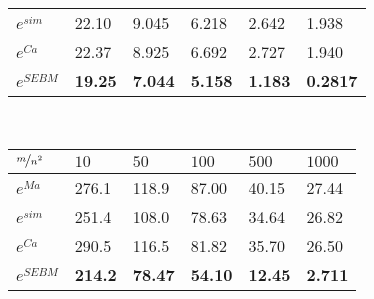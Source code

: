 \begin{table*}[]
\begin{minipage}[]{0.8\textwidth}
\begin{tabular}{llllll}
			$e^{sim}$   & 22.10 & 9.045 & 6.218 & 2.642 & 1.938 \\
			$e^{Ca}$    & 22.37 & 8.925 & 6.692 & 2.727 & 1.940 \\
			$e^{SEBM}$  & \textbf{19.25} & \textbf{7.044} & \textbf{5.158} & \textbf{1.183} & \textbf{0.2817}  \\
			\hline
			\end{tabular}
    \end{minipage}
	\\\vspace{4mm}
    \begin{minipage}[]{0.8\textwidth}
        \centering
        \caption{Complex Reward Division Game average errors}\label{tab4}
			\centering
			\begin{tabular}{llllll}
			\hline
			$\nicefrac{m}{n^2}$ & $10$ & $50$ & $100$ & $500$ & $1000$ \\
			\hline
			$e^{Ma}$   & 276.1 & 118.9 & 87.00 & 40.15 & 27.44 \\
			$e^{sim}$  & 251.4 & 108.0 & 78.63 & 34.64 & 26.82 \\
			$e^{Ca}$   & 290.5 & 116.5 & 81.82 & 35.70 & 26.50 \\
			$e^{SEBM}$ & \textbf{214.2} & \textbf{78.47} & \textbf{54.10} & \textbf{12.45} & \textbf{2.711}  \\
			\hline
			\end{tabular}
    \end{minipage}
    \vspace{3mm}
    \caption[Average errors approximating the Shapley Value across games and methods]{Average absolute errors in the Shapley value calculation across all players in the four cooperative games (units in $10^{-4}$), for the different sampling schemes with different sampling budgets $m$ per number of strata (with $n^2=15^2$ for all). lowest error results are boldened.}
    \label{Table2}
\end{table*}
